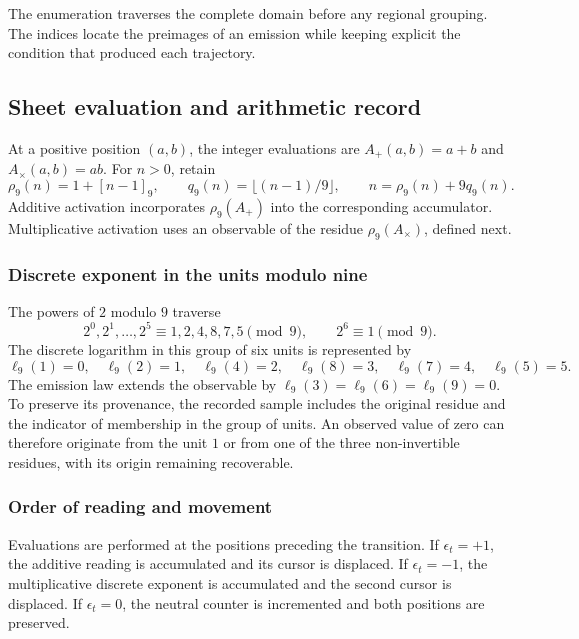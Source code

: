 The enumeration traverses the complete domain before any regional
grouping. The indices locate the preimages of an emission while keeping
explicit the condition that produced each trajectory.

\subsection{Sheet evaluation and arithmetic record}
\label{act21:tpk:lecturas}

At a positive position \((a,b)\), the integer evaluations are
\(A_+(a,b)=a+b\) and \(A_\times(a,b)=ab\). For \(n>0\), retain
\begin{equation}
 \rho_9(n)=1+[n-1]_9,\qquad
 q_9(n)=\lfloor(n-1)/9\rfloor,\qquad
 n=\rho_9(n)+9q_9(n).
 \label{act21:tpk:division-evaluacion}
\end{equation}
Additive activation incorporates \(\rho_9(A_+)\) into the corresponding
accumulator. Multiplicative activation uses an observable of the residue
\(\rho_9(A_\times)\), defined next.

\subsubsection{Discrete exponent in the units modulo nine}

The powers of \(2\) modulo \(9\) traverse
\[
 2^0,2^1,\ldots,2^5\equiv1,2,4,8,7,5\pmod9,
 \qquad 2^6\equiv1\pmod9.
\]
The discrete logarithm in this group of six units is represented by
\begin{equation}
 \ell_9(1)=0,\quad\ell_9(2)=1,\quad\ell_9(4)=2,
 \quad\ell_9(8)=3,\quad\ell_9(7)=4,\quad\ell_9(5)=5.
 \label{act21:tpk:logaritmo}
\end{equation}
The emission law extends the observable by
\(\ell_9(3)=\ell_9(6)=\ell_9(9)=0\). To preserve its provenance, the
recorded sample includes the original residue and the indicator of
membership in the group of units. An observed value of zero can therefore
originate from the unit \(1\) or from one of the three non-invertible
residues, with its origin remaining recoverable.



\subsubsection{Order of reading and movement}

Evaluations are performed at the positions preceding the transition.
If \(\epsilon_t=+1\), the additive reading is accumulated and its cursor
is displaced. If \(\epsilon_t=-1\), the multiplicative discrete exponent
is accumulated and the second cursor is displaced. If \(\epsilon_t=0\),
the neutral counter is incremented and both positions are preserved.

